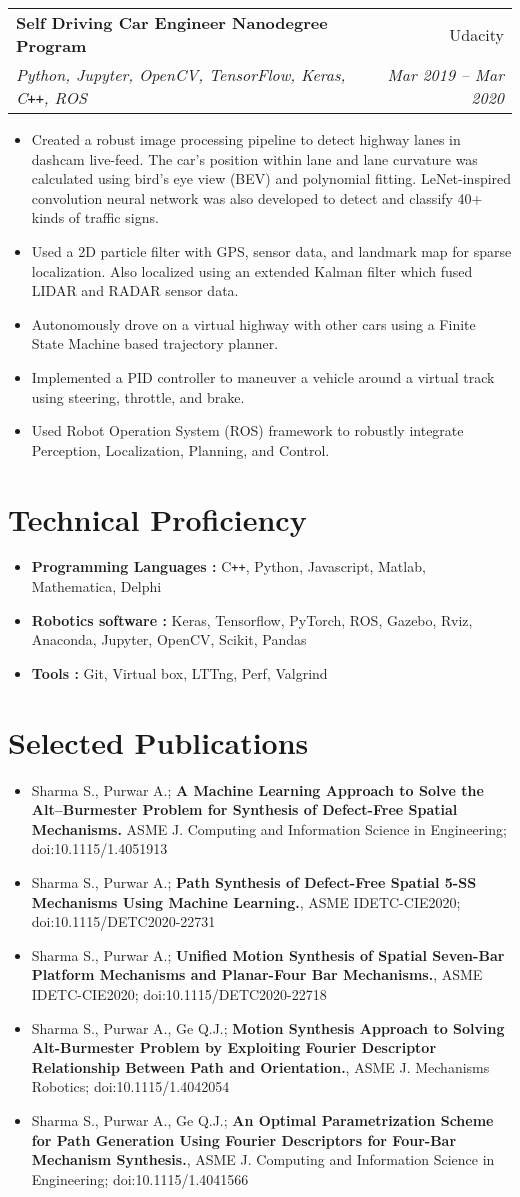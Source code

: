 \documentclass[letterpaper,10pt]{article}
\makeatletter
\newcommand{\resumeHeading}[4]{
  \vspace{-1pt}
    \begin{tabular*}{0.97\textwidth}{l@{\extracolsep{\fill}}r}
      \textbf{#1} & #2 \vspace{-2pt}\\ \vspace{1pt}
      \textit{\small#3} & \textit{\small #4} \\
    \end{tabular*}
}
\newcommand{\resumeSection}[1]{
\vspace{-12pt}
\section{\textbf{#1}}
}
\newcommand{\resumeItemListStart}{
\vspace{-6pt}
\begin{itemize}[leftmargin=14pt]
}
\newcommand{\resumeItemListEnd}{
\vspace{+6pt}
\end{itemize}
}
\newcommand{\resumeItem}[1]{
  \linespread{.95}
  \selectfont
  \item\small{
      {#1 \vspace{-7pt}
      }
  }
  \linespread{1}
  \selectfont
}
\makeatother
\begin{document}
    \resumeHeading{Self Driving Car Engineer Nanodegree Program}{Udacity}{Python, Jupyter, OpenCV, TensorFlow, Keras, C\texttt{++}, ROS}{Mar 2019 -- Mar 2020}
    \resumeItemListStart
    \resumeItem{Created a robust image processing pipeline to detect highway lanes in dashcam live-feed. The car's position within lane and lane curvature was calculated using bird's eye view (BEV) and polynomial fitting. LeNet-inspired convolution neural network was also developed to detect and classify 40+ kinds of traffic signs.}
    \resumeItem{Used a 2D particle filter with GPS, sensor data, and landmark map for sparse localization. Also localized using an extended Kalman filter which fused LIDAR and RADAR sensor data.}
    \resumeItem{Autonomously drove on a virtual highway with other cars using a Finite State Machine based trajectory planner.}
    \resumeItem{Implemented a PID controller to maneuver a vehicle around a virtual track using steering, throttle, and brake.}
    \resumeItem{Used Robot Operation System (ROS) framework to robustly integrate Perception, Localization, Planning, and Control.}
    \resumeItemListEnd


\resumeSection{Technical Proficiency}
	\vspace{+7pt}
	\resumeItemListStart
	\resumeItem{\textbf{Programming Languages :} C\texttt{++}, Python, Javascript, Matlab, Mathematica, Delphi}
	\resumeItem{\textbf{Robotics software :} Keras, Tensorflow, PyTorch, ROS, Gazebo, Rviz, Anaconda, Jupyter, OpenCV, Scikit, Pandas}
	\resumeItem{\textbf{Tools :} Git, Virtual box, LTTng, Perf, Valgrind}
	\resumeItemListEnd


\resumeSection{Selected Publications}
\vspace{+7pt}
\resumeItemListStart
\resumeItem{Sharma S., Purwar A.; \textbf{A Machine Learning Approach to Solve the Alt–Burmester Problem for Synthesis of Defect-Free Spatial Mechanisms.} ASME J. Computing and Information Science in Engineering; doi:10.1115/1.4051913}
\resumeItem{Sharma S., Purwar A.; \textbf{Path Synthesis of Defect-Free Spatial 5-SS Mechanisms Using Machine Learning.}, ASME IDETC-CIE2020; doi:10.1115/DETC2020-22731}
\resumeItem{Sharma S., Purwar A.; \textbf{Unified Motion Synthesis of Spatial Seven-Bar Platform Mechanisms and Planar-Four Bar Mechanisms.}, ASME IDETC-CIE2020; doi:10.1115/DETC2020-22718}
\resumeItem{Sharma S., Purwar A., Ge Q.J.; \textbf{Motion Synthesis Approach to Solving Alt-Burmester Problem by Exploiting Fourier Descriptor Relationship Between Path and Orientation.}, ASME J. Mechanisms Robotics; doi:10.1115/1.4042054}
\resumeItem{Sharma S., Purwar A., Ge Q.J.; \textbf{An Optimal Parametrization Scheme for Path Generation Using Fourier Descriptors for Four-Bar Mechanism Synthesis.}, ASME J. Computing and Information Science in Engineering; doi:10.1115/1.4041566}
\resumeItemListEnd
\end{document}
